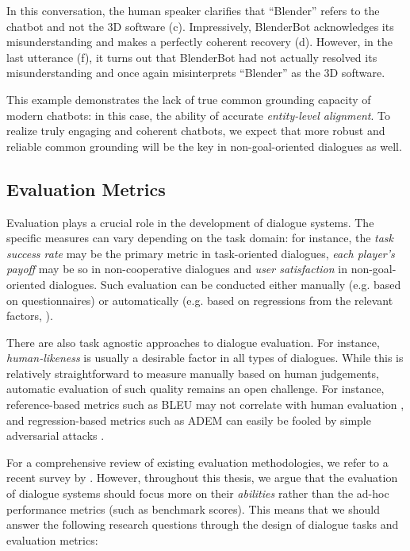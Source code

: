 In this conversation, the human speaker clarifies that ``Blender'' refers to the chatbot and not the 3D software (c). Impressively, BlenderBot acknowledges its misunderstanding and makes a perfectly coherent recovery (d). However, in the last utterance (f), it turns out that BlenderBot had not actually resolved its misunderstanding and once again misinterprets ``Blender'' as the 3D software. 

This example demonstrates the lack of true common grounding capacity of modern chatbots: in this case, the ability of accurate \textit{entity-level alignment}. To realize truly engaging and coherent chatbots, we expect that more robust and reliable common grounding will be the key in non-goal-oriented dialogues as well.

\subsection{Evaluation Metrics}
\label{02_subsec:evaluation}

Evaluation plays a crucial role in the development of dialogue systems. The specific measures can vary depending on the task domain: for instance, the \textit{task success rate} may be the primary metric in task-oriented dialogues, \textit{each player's payoff} may be so in non-cooperative dialogues and \textit{user satisfaction} in non-goal-oriented dialogues. Such evaluation can be conducted either manually (e.g. based on questionnaires) or automatically (e.g. based on regressions from the relevant factors, \citealt{walker-etal-1997-paradise}).

There are also task agnostic approaches to dialogue evaluation. For instance, \textit{human-likeness} is usually a desirable factor in all types of dialogues. While this is relatively straightforward to measure manually based on human judgements, automatic evaluation of such quality remains an open challenge. For instance, reference-based metrics such as BLEU \citep{papineni-etal-2002-bleu} may not correlate with human evaluation \citep{liu2016}, and regression-based metrics such as ADEM \citep{lowe-etal-2017-towards} can easily be fooled by simple adversarial attacks \citep{sai2019re}.

For a comprehensive review of existing evaluation methodologies, we refer to a recent survey by \citet{Deriu2020SurveyOE}. However, throughout this thesis, we argue that the evaluation of dialogue systems should focus more on their \textit{abilities} \citep{Hernndez-Orallo:2017:MME:3110808} rather than the ad-hoc performance metrics (such as benchmark scores). This means that we should answer the following research questions through the design of dialogue tasks and evaluation metrics:

